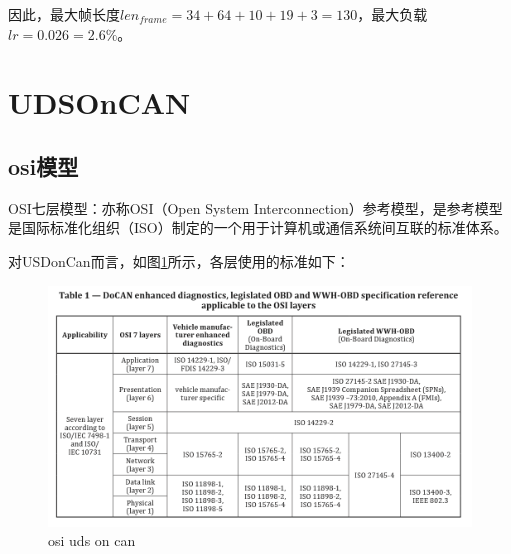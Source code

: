 因此，最大帧长度$len_{frame}=34+64+10+19+3=130$，最大负载$lr=0.026=2.6\%$。
\section{UDSOnCAN}
\subsection{osi模型}
OSI七层模型：亦称OSI（Open System Interconnection）参考模型，是参考模型是国际标准化组织（ISO）制定的一个用于计算机或通信系统间互联的标准体系。

对USDonCan而言，如图\ref{fig:usd_oncan}所示，各层使用的标准如下：
\begin{figure}[ht]
    \centering
    \includegraphics[]{pic/osi_uds_oncan.png}
    \caption{osi uds on can}
    \label{fig:usd_oncan}
\end{figure}
